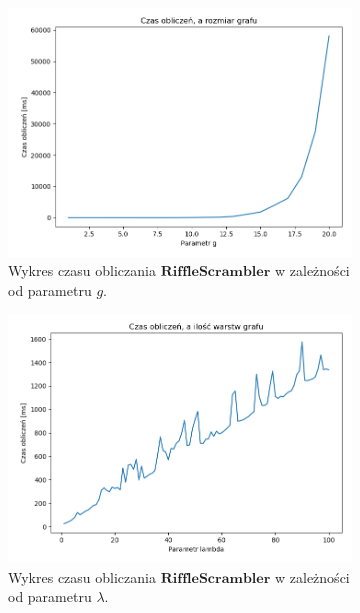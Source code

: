 \begin{figure}
\begin{subfigure}{0.5\textwidth}
		\includegraphics[width=\textwidth]{bench_3.png}
		\centering
		\caption{Wykres czasu obliczania $\mathbf{RiffleScrambler}$ w zależności od parametru $g$.}
		\label{impl::b3}
	\end{subfigure}
	\begin{subfigure}{0.5\textwidth}
		\includegraphics[width=\textwidth]{bench_4.png}
		\centering
		\caption{Wykres czasu obliczania $\mathbf{RiffleScrambler}$ w zależności od parametru $\lambda$.}
		\label{impl::b4}
	\end{subfigure}
		\begin{subfigure}{0.5\textwidth}

\end{subfigure}
\end{figure}
